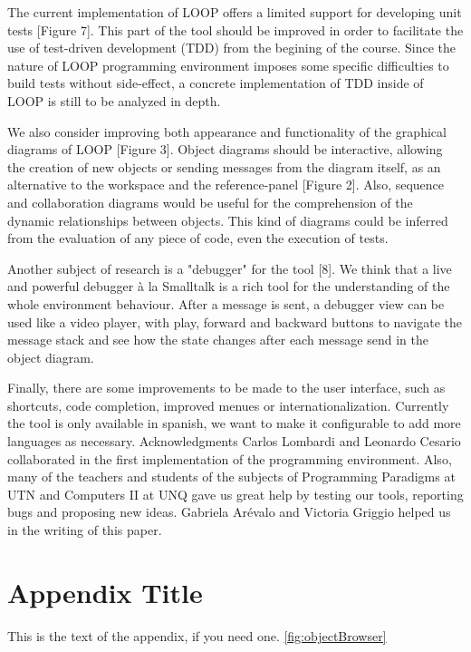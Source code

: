 \documentclass{sigplanconf}
\begin{document}
The current implementation of LOOP offers a limited support for developing unit tests [Figure 7]. This part of the tool should be improved in order to facilitate the use of test-driven development (TDD) from the begining of the course. Since the nature of LOOP programming environment imposes some specific difficulties to build tests without side-effect, a concrete implementation of TDD inside of LOOP is still to be analyzed in depth.

We also consider improving both appearance and functionality of the graphical diagrams of LOOP [Figure 3]. Object diagrams should be interactive, allowing the creation of new objects or sending messages from the diagram itself, as an alternative to the workspace and the reference-panel [Figure 2]. Also, sequence and collaboration diagrams would be useful for the comprehension of the dynamic relationships between objects. This kind of diagrams could be inferred from the evaluation of any piece of code, even the execution of tests.

Another subject of research is a "debugger" for the tool [8]. We think that a live and powerful debugger à la Smalltalk is a rich tool for the understanding of the whole environment behaviour. 
After a message is sent, a debugger view can be used like a video player, with play, forward and  backward buttons to navigate the message stack and see how the state changes after each message send in the object diagram.

Finally, there are some improvements to be made to the user interface, such as shortcuts, code completion, improved menues or internationalization. Currently the tool is only available in spanish, we want to make it configurable to add more languages as necessary.
Acknowledgments
Carlos Lombardi and Leonardo Cesario collaborated in the first implementation of the programming environment. Also, many of the teachers and students of the subjects of Programming Paradigms at UTN and Computers II at UNQ gave us great help by testing our tools, reporting bugs and proposing new ideas. Gabriela Arévalo and Victoria Griggio helped us in the writing of this paper.

\appendix
\section{Appendix Title}

This is the text of the appendix, if you need one. \ref{fig:objectBrowser}
\end{document}
